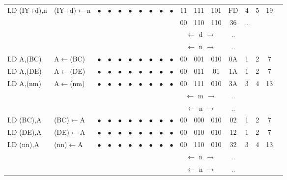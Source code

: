 \documentclass[oneside,a4paper]{book}
\begin{document}
{\begin{tabular}{llcccccccccccccccl}
		LD (IY+d),n & (IY+d)$\leftarrow$n & 
			$\bullet$ & $\bullet$ & $\bullet$ & $\bullet$ & $\bullet$ & $\bullet$ & $\bullet$ & $\bullet$ & 
			11 & 111 & 101 & 
			FD & 4 & 
			5 & 19 & \\
		\multicolumn{10}{c}{} & 00 & 110 & 110 & 36 & .. & & & \\
		\multicolumn{10}{c}{} & \multicolumn{3}{c}{$\longleftarrow$ d $\longrightarrow$} & .. & & & \\
		\multicolumn{10}{c}{} & \multicolumn{3}{c}{$\longleftarrow$ n $\longrightarrow$} & .. & & & \\[4pt]

		LD A,(BC) & A$\leftarrow$(BC) & 
			$\bullet$ & $\bullet$ & $\bullet$ & $\bullet$ & $\bullet$ & $\bullet$ & $\bullet$ & $\bullet$ & 
			00 & 001 & 010 & 
			0A & 1 & 
			2 & 7 & \\[4pt]

		LD A,(DE) & A$\leftarrow$(DE) & 
			$\bullet$ & $\bullet$ & $\bullet$ & $\bullet$ & $\bullet$ & $\bullet$ & $\bullet$ & $\bullet$ & 
			00 & 011 & 01 & 
			1A & 1 & 
			2 & 7 & \\[4pt]

		LD A,(nm) & A$\leftarrow$(nm) & 
			$\bullet$ & $\bullet$ & $\bullet$ & $\bullet$ & $\bullet$ & $\bullet$ & $\bullet$ & $\bullet$ & 
			00 & 111 & 010 & 
			3A & 3 & 
			4 & 13 & \\
		\multicolumn{10}{c}{} & \multicolumn{3}{c}{$\longleftarrow$ m $\longrightarrow$} & .. & & & \\
		\multicolumn{10}{c}{} & \multicolumn{3}{c}{$\longleftarrow$ n $\longrightarrow$} & .. & & & \\[4pt]
		
		LD (BC),A & (BC)$\leftarrow$A & 
			$\bullet$ & $\bullet$ & $\bullet$ & $\bullet$ & $\bullet$ & $\bullet$ & $\bullet$ & $\bullet$ & 
			00 & 000 & 010 & 
			02 & 1 & 
			2 & 7 & \\[4pt]

		LD (DE),A & (DE)$\leftarrow$A & 
			$\bullet$ & $\bullet$ & $\bullet$ & $\bullet$ & $\bullet$ & $\bullet$ & $\bullet$ & $\bullet$ & 
			00 & 010 & 010 & 
			12 & 1 & 
			2 & 7 & \\[4pt]

		LD (nn),A & (nn)$\leftarrow$A & 
			$\bullet$ & $\bullet$ & $\bullet$ & $\bullet$ & $\bullet$ & $\bullet$ & $\bullet$ & $\bullet$ & 
			00 & 110 & 010 & 
			32 & 3 & 
			4 & 13 & \\
		\multicolumn{10}{c}{} & \multicolumn{3}{c}{$\longleftarrow$ n $\longrightarrow$} & .. & & & \\
		\multicolumn{10}{c}{} & \multicolumn{3}{c}{$\longleftarrow$ n $\longrightarrow$} & .. & & & \\[4pt]


\end{tabular}}
\end{document}
